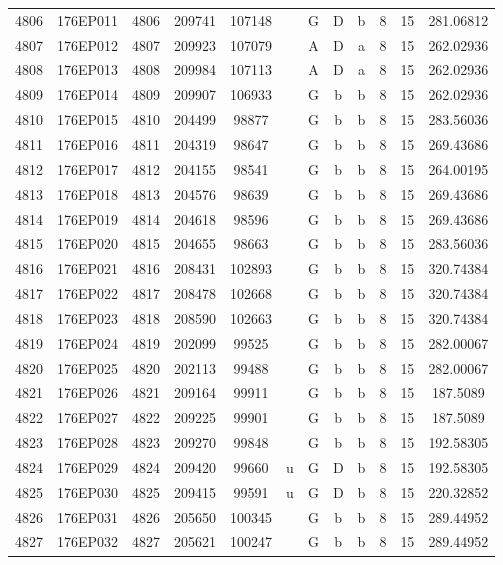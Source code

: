 \begin{tabular}{|*{12}{c|}}
4806 & 176EP011 & 4806 & 209741 & 107148 &  & G & D & b & 8 & 15 & 281.06812 \\ 
4807 & 176EP012 & 4807 & 209923 & 107079 &  & A & D & a & 8 & 15 & 262.02936 \\ 
4808 & 176EP013 & 4808 & 209984 & 107113 &  & A & D & a & 8 & 15 & 262.02936 \\ 
4809 & 176EP014 & 4809 & 209907 & 106933 &  & G & b & b & 8 & 15 & 262.02936 \\ 
4810 & 176EP015 & 4810 & 204499 & 98877 &  & G & b & b & 8 & 15 & 283.56036 \\ 
4811 & 176EP016 & 4811 & 204319 & 98647 &  & G & b & b & 8 & 15 & 269.43686 \\ 
4812 & 176EP017 & 4812 & 204155 & 98541 &  & G & b & b & 8 & 15 & 264.00195 \\ 
4813 & 176EP018 & 4813 & 204576 & 98639 &  & G & b & b & 8 & 15 & 269.43686 \\ 
4814 & 176EP019 & 4814 & 204618 & 98596 &  & G & b & b & 8 & 15 & 269.43686 \\ 
4815 & 176EP020 & 4815 & 204655 & 98663 &  & G & b & b & 8 & 15 & 283.56036 \\ 
4816 & 176EP021 & 4816 & 208431 & 102893 &  & G & b & b & 8 & 15 & 320.74384 \\ 
4817 & 176EP022 & 4817 & 208478 & 102668 &  & G & b & b & 8 & 15 & 320.74384 \\ 
4818 & 176EP023 & 4818 & 208590 & 102663 &  & G & b & b & 8 & 15 & 320.74384 \\ 
4819 & 176EP024 & 4819 & 202099 & 99525 &  & G & b & b & 8 & 15 & 282.00067 \\ 
4820 & 176EP025 & 4820 & 202113 & 99488 &  & G & b & b & 8 & 15 & 282.00067 \\ 
4821 & 176EP026 & 4821 & 209164 & 99911 &  & G & b & b & 8 & 15 & 187.5089 \\ 
4822 & 176EP027 & 4822 & 209225 & 99901 &  & G & b & b & 8 & 15 & 187.5089 \\ 
4823 & 176EP028 & 4823 & 209270 & 99848 &  & G & b & b & 8 & 15 & 192.58305 \\ 
4824 & 176EP029 & 4824 & 209420 & 99660 & u & G & D & b & 8 & 15 & 192.58305 \\ 
4825 & 176EP030 & 4825 & 209415 & 99591 & u & G & D & b & 8 & 15 & 220.32852 \\ 
4826 & 176EP031 & 4826 & 205650 & 100345 &  & G & b & b & 8 & 15 & 289.44952 \\ 
4827 & 176EP032 & 4827 & 205621 & 100247 &  & G & b & b & 8 & 15 & 289.44952 \\ 

\end{tabular}
